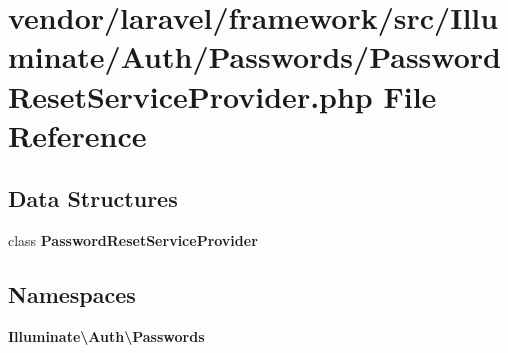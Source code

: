 \section{vendor/laravel/framework/src/\+Illuminate/\+Auth/\+Passwords/\+Password\+Reset\+Service\+Provider.php File Reference}
\label{_password_reset_service_provider_8php}
\subsection*{Data Structures}
\begin{DoxyCompactItemize}
\item 
class {\bf Password\+Reset\+Service\+Provider}
\end{DoxyCompactItemize}
\subsection*{Namespaces}
\begin{DoxyCompactItemize}
\item 
 {\bf Illuminate\textbackslash{}\+Auth\textbackslash{}\+Passwords}
\end{DoxyCompactItemize}
